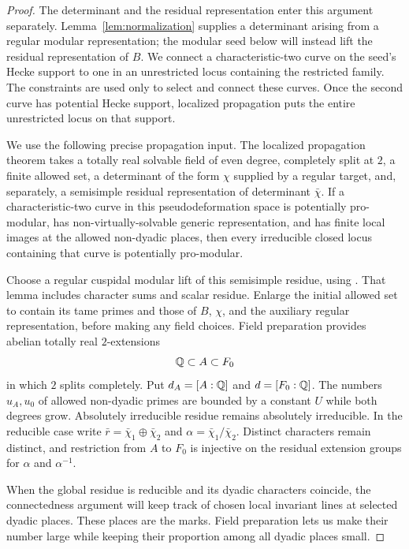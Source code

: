 \begin{proof}
The determinant and the residual representation enter this argument
separately. Lemma~\ref{lem:normalization} supplies a determinant arising
from a regular modular representation; the modular seed below will
instead lift the residual representation of $B$.
We connect a characteristic-two curve on the seed's Hecke support
to one in an unrestricted locus containing the restricted family.
The constraints are used only to select and connect these curves.
Once the second curve has potential Hecke support,
localized propagation puts the entire unrestricted locus on that support.

We use the following precise propagation input.
The localized propagation theorem \cite[Theorem~5.1]{FM2} takes a
totally real solvable field of even degree, completely split at $2$,
a finite allowed set, a determinant of the form $\chi$ supplied by
a regular target, and, separately, a semisimple residual
representation of determinant $\bar\chi$.  If a characteristic-two
curve in this pseudodeformation space is potentially pro-modular,
has non-virtually-solvable generic representation, and has finite
local images at the allowed non-dyadic places, then every
irreducible closed locus containing that curve is potentially
pro-modular.

Choose a regular cuspidal modular lift of this semisimple residue,
using \cite[Lemma~7.2]{FM2}.  That lemma includes character sums and
scalar residue.  Enlarge the initial allowed set to contain its
tame primes and those of $B$, $\chi$, and the auxiliary regular
representation, before making any field choices.  Field preparation \cite[Proposition~6.1]{FM2} provides
abelian totally real $2$-extensions
\[
 \mathbb Q\subset A\subset F_0
\]
in which $2$ splits completely.  Put $d_A=[A:\mathbb Q]$ and
$d=[F_0:\mathbb Q]$.  The numbers $u_A,u_0$ of allowed non-dyadic primes
are bounded by a constant $U$ while both degrees grow.  Absolutely
irreducible residue remains absolutely irreducible.  In the
reducible case write $\bar r=\bar\chi_1\oplus\bar\chi_2$ and
$\alpha=\bar\chi_1/\bar\chi_2$.  Distinct characters remain
distinct, and restriction from $A$ to $F_0$ is injective on the
residual extension groups for $\alpha$ and $\alpha^{-1}$.

When the global residue is reducible and its dyadic characters coincide,
the connectedness argument will
keep track of chosen local invariant lines at selected dyadic places.
These places are the marks. Field preparation lets us make their
number large while keeping their proportion among all dyadic places
small.


\end{proof}

